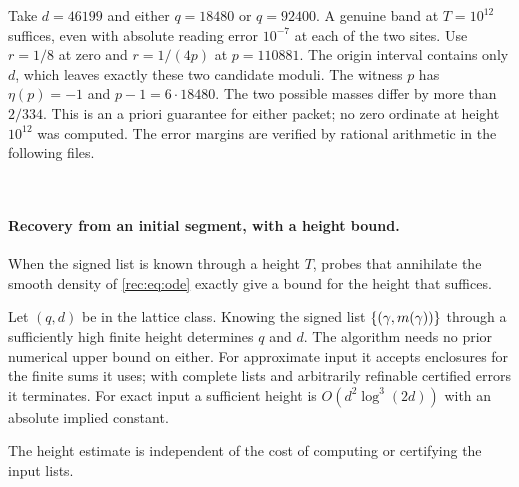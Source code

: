 \begin{example}\label{rec:ex:band}
Take $d=46199$ and either $q=18480$ or $q=92400$. A genuine band at $T=10^{12}$ suffices,
even with absolute reading error $10^{-7}$ at each of the two sites. Use $r=1/8$ at zero and
$r=1/(4p)$ at $p=110881$. The origin interval contains only $d$, which leaves exactly these
two candidate moduli. The witness $p$ has $\eta(p)=-1$ and $p-1=6\cdot18480$. The two
possible masses differ by more than $2/334$. This is an a priori guarantee for either
packet; no zero ordinate at height $10^{12}$ was computed. The error margins are verified
by rational arithmetic in the following files.
\begin{center}
\\
\end{center}
\end{example}

\paragraph{Recovery from an initial segment, with a height bound.}
When the signed list is known through a height $T$, probes that annihilate the smooth
density of \eqref{rec:eq:ode} exactly give a bound for the height that suffices.

\begin{theorem}\label{rec:thm:recovery}
Let $(q,d)$ be in the lattice class. Knowing the signed list $\{(\gamma,m(\gamma))\}$
through a sufficiently high finite height determines $q$ and $d$. The algorithm needs no
prior numerical upper bound on either. For approximate input it accepts enclosures for the
finite sums it uses; with complete lists and arbitrarily refinable certified errors it
terminates. For exact input a sufficient height is $O(d^2\log^3(2d))$ with an absolute
implied constant.
\end{theorem}

The height estimate is independent of the cost of computing or certifying the input lists.

